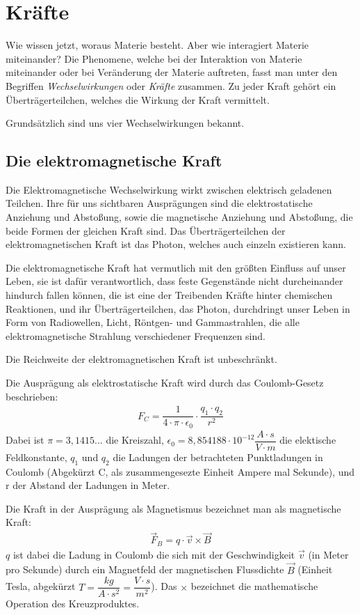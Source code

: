 \section{Kräfte}
Wie wissen jetzt, woraus Materie besteht. Aber wie interagiert Materie miteinander? Die Phenomene, welche bei der Interaktion von Materie miteinander oder bei Veränderung der Materie auftreten, fasst man unter den Begriffen \textit{Wechselwirkungen} oder \textit{Kräfte} zusammen. Zu jeder Kraft gehört ein Überträgerteilchen, welches die Wirkung der Kraft vermittelt.

Grundsätzlich sind uns vier Wechselwirkungen bekannt.

\subsection{Die elektromagnetische Kraft}


Die Elektromagnetische Wechselwirkung wirkt zwischen elektrisch geladenen Teilchen. Ihre für uns sichtbaren Ausprägungen sind die elektrostatische Anziehung und Abstoßung, sowie die magnetische Anziehung und Abstoßung, die beide Formen der gleichen Kraft sind. Das Überträgerteilchen der elektromagnetischen Kraft ist das Photon, welches auch einzeln existieren kann.

Die elektromagnetische Kraft hat vermutlich mit den größten Einfluss auf unser Leben, sie ist dafür verantwortlich, dass feste Gegenstände nicht durcheinander hindurch fallen können, die ist eine der Treibenden Kräfte hinter chemischen Reaktionen, und ihr Überträgerteilchen, das Photon, durchdringt unser Leben in Form von Radiowellen, Licht, Röntgen- und Gammastrahlen, die alle elektromagnetische Strahlung verschiedener Frequenzen sind.

Die Reichweite der elektromagnetischen Kraft ist unbeschränkt.

Die Ausprägung als elektrostatische Kraft wird durch das Coulomb-Gesetz beschrieben:
\begin{eqnarray}
 F_C=\dfrac{1}{4\cdot\pi\cdot\epsilon_0}\cdot\dfrac{q_1\cdot q_2}{r^2}
 \end{eqnarray}
Dabei ist $\pi=3,1415...$ die Kreiszahl, $\epsilon_0=8,854188\cdot 10^{-12} \dfrac{A\cdot s}{V\cdot m}$ die elektische Feldkonstante, $q_1$ und $q_2$ die Ladungen der betrachteten Punktladungen in Coulomb (Abgekürzt C, als zusammengesezte Einheit Ampere mal Sekunde), und r der Abstand der Ladungen in Meter.

Die Kraft in der Ausprägung als Magnetismus bezeichnet man als magnetische Kraft:
\begin{eqnarray}
\vec{F}_B = q \cdot \vec{v} \times \vec{B}
\end{eqnarray}
$q$ ist dabei die Ladung in Coulomb die sich mit der Geschwindigkeit $\vec{v}$ (in Meter pro Sekunde) durch ein Magnetfeld der magnetischen Flussdichte $\vec{B}$ (Einheit Tesla, abgekürzt $T=\dfrac{kg}{A\cdot s^2}=\dfrac{V \cdot s}{m^2}$). Das $\times$ bezeichnet die mathematische Operation des Kreuzproduktes.

